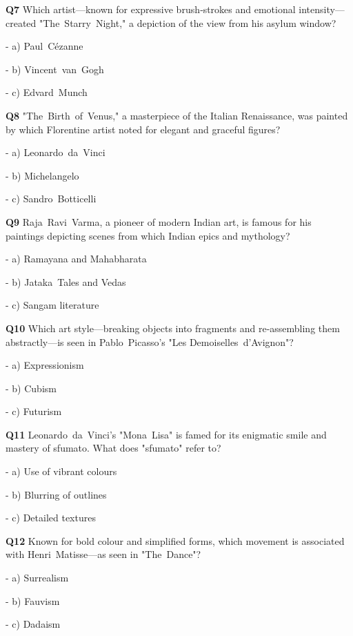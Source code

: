 \textbf{Q7} Which artist—known for expressive brush‑strokes and emotional intensity—created "The Starry Night," a depiction of the view from his asylum window?\par
\quad - a) Paul Cézanne\par
\quad - b) Vincent van Gogh\par
\quad - c) Edvard Munch\par

\textbf{Q8} "The Birth of Venus," a masterpiece of the Italian Renaissance, was painted by which Florentine artist noted for elegant and graceful figures?\par
\quad - a) Leonardo da Vinci\par
\quad - b) Michelangelo\par
\quad - c) Sandro Botticelli\par

\textbf{Q9} Raja Ravi Varma, a pioneer of modern Indian art, is famous for his paintings depicting scenes from which Indian epics and mythology?\par
\quad - a) Ramayana and Mahabharata\par
\quad - b) Jataka Tales and Vedas\par
\quad - c) Sangam literature\par

\textbf{Q10} Which art style—breaking objects into fragments and re‑assembling them abstractly—is seen in Pablo Picasso's "Les Demoiselles d'Avignon"?\par
\quad - a) Expressionism\par
\quad - b) Cubism\par
\quad - c) Futurism\par

\textbf{Q11} Leonardo da Vinci's "Mona Lisa" is famed for its enigmatic smile and mastery of sfumato. What does "sfumato" refer to?\par
\quad - a) Use of vibrant colours\par
\quad - b) Blurring of outlines\par
\quad - c) Detailed textures\par

\textbf{Q12} Known for bold colour and simplified forms, which movement is associated with Henri Matisse—as seen in "The Dance"?\par
\quad - a) Surrealism\par
\quad - b) Fauvism\par
\quad - c) Dadaism\par

